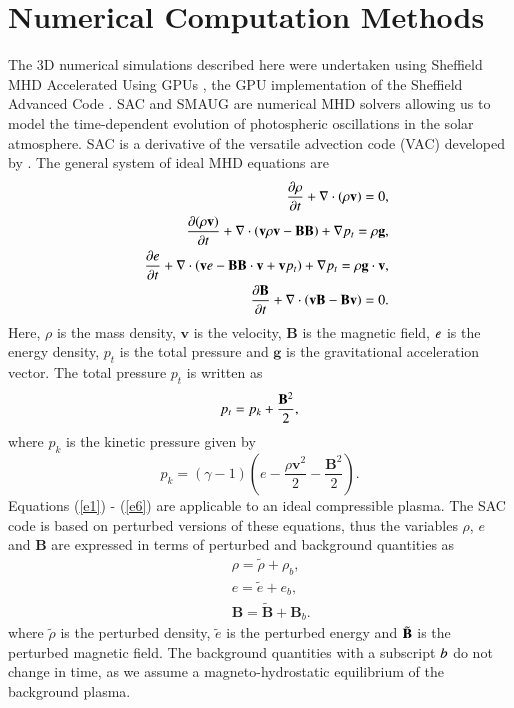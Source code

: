 \documentclass[preprint,authoryear,12pt]{elsarticle}
\begin{document}
\section{Numerical Computation Methods}

The 3D numerical simulations described here were undertaken using Sheffield MHD Accelerated Using GPUs \citep[SMAUG,][]{Griffiths2015}, the GPU implementation of the Sheffield Advanced Code \citep[SAC,][]{Shelyag2008}. SAC and SMAUG are numerical MHD solvers allowing us to model the time-dependent evolution of photospheric oscillations in the solar atmosphere. SAC is a derivative of the versatile advection code (VAC) developed by \citep{Toth1996}.  The general system of ideal MHD equations are
\begin{eqnarray}
&& {{\partial \rho}\over{\partial t}}+\nabla\cdot\left( \rho{\mathbf v}\right)=0, \label{e1} \\
&& {{\partial ( \rho {\bf v})}\over{\partial t}}+\nabla\cdot\left( {\bf v}\rho {\bf v}-{\bf B B}\right)+\nabla p_t=\rho{\bf g}, \label{e2}\\
&& \frac{\partial e}{\partial t}+\nabla\cdot\left({\bf v}e-{\bf B B}\cdot{\bf v}+{\bf v}p_{t}\right)+\nabla p_t=\rho{\bf g}\cdot{\bf v}, \label{e3} \\
&& {{\partial{\bf B}}\over{\partial t}} +\nabla \cdot\left(  {\bf vB}-{\bf Bv}\right)=0. \label{e4}
\end{eqnarray}
Here, $\rho$ is the mass density, $\mathbf v$ is the velocity,  $\mathbf B$ is the magnetic field, $\it{e}$ is the energy density, $p_{t}$ is the total pressure and $\mathbf g$ is the gravitational acceleration vector.
The total pressure $p_{t}$ is written as
\begin{equation}
p_{t}=p_{k}+{{\bf B}^{2}\over{2}}, \label{e5}
\end{equation}
where $p_k$ is the kinetic pressure given by
\begin{equation}
p_{k}=\left(\gamma -1\right)\left(e-\frac{\rho {\mathbf v}^{2}}{2}-\frac{{\mathbf B}^{2}}{2}\right). \label{e6}
\end{equation}
Equations (\ref{e1}) - (\ref{e6}) are applicable to an ideal compressible plasma. The SAC code is based on perturbed versions of these equations, thus the variables $\rho $, $e$ and  $\mathbf B$ are expressed in terms of perturbed and background quantities as
\begin{eqnarray}
&& \rho = \tilde{\rho}+\rho_b, \nonumber \\
&& e = \tilde{e}+e_b,  \nonumber \\
&& {\mathbf B} = \tilde{\mathbf B}+{\mathbf B}_b.  \nonumber 
\end{eqnarray}
where $\tilde{\rho}$ is the  perturbed density,  $\tilde{e}$ is the perturbed energy and $\tilde{\bf B}$  is the perturbed magnetic field. The background quantities with a subscript $\it{b}$ do not change in time, as we assume a magneto-hydrostatic equilibrium of the background plasma. 
\end{document}
